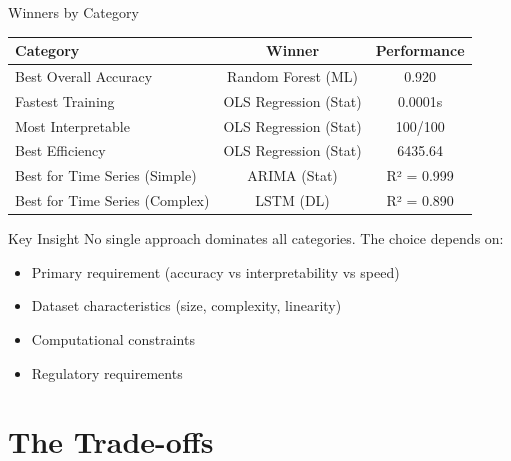 \documentclass[aspectratio=169,10pt]{beamer}
\begin{document}
\begin{frame}{Winners by Category}
\begin{center}
\begin{tabular}{lcc}
\toprule
\textbf{Category} & \textbf{Winner} & \textbf{Performance} \\
\midrule
Best Overall Accuracy & Random Forest (ML) & 0.920 \\
Fastest Training & OLS Regression (Stat) & 0.0001s \\
Most Interpretable & OLS Regression (Stat) & 100/100 \\
Best Efficiency & OLS Regression (Stat) & 6435.64 \\
Best for Time Series (Simple) & ARIMA (Stat) & R² = 0.999 \\
Best for Time Series (Complex) & LSTM (DL) & R² = 0.890 \\
\bottomrule
\end{tabular}
\end{center}

\vspace{0.2cm}

\begin{block}{Key Insight}
No single approach dominates all categories. The choice depends on:
\begin{itemize}
    \item Primary requirement (accuracy vs interpretability vs speed)
    \item Dataset characteristics (size, complexity, linearity)
    \item Computational constraints
    \item Regulatory requirements
\end{itemize}
\end{block}
\end{frame}

\section{The Trade-offs}
\end{document}
